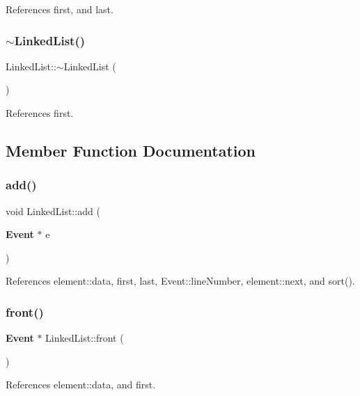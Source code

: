 References first, and last.

\mbox{\label{classLinkedList_a35811ed58ff0d8d9cc9b309b8d8f5111}} 
\subsubsection{$\sim$\+Linked\+List()}
{\footnotesize\ttfamily Linked\+List\+::$\sim$\+Linked\+List (\begin{DoxyParamCaption}{ }\end{DoxyParamCaption})\hspace{0.3cm}{\ttfamily [virtual]}}



References first.



\subsection{Member Function Documentation}
\mbox{\label{classLinkedList_a6cf5b1b0df4fd286bfc8da6f87e6e268}} 
\subsubsection{add()}
{\footnotesize\ttfamily void Linked\+List\+::add (\begin{DoxyParamCaption}\item[{\textbf{ Event} $\ast$}]{e }\end{DoxyParamCaption})}



References element\+::data, first, last, Event\+::line\+Number, element\+::next, and sort().

\mbox{\label{classLinkedList_a20f909801562b081182389f39e6a9a6a}} 
\subsubsection{front()}
{\footnotesize\ttfamily \textbf{ Event} $\ast$ Linked\+List\+::front (\begin{DoxyParamCaption}{ }\end{DoxyParamCaption})}



References element\+::data, and first.

